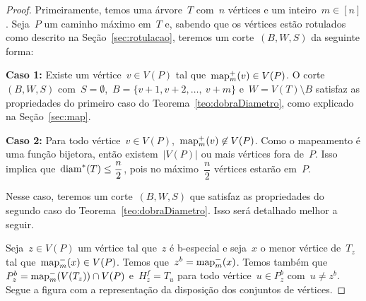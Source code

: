 		\begin{proof}
		Primeiramente, temos uma árvore~$T$ com~${n}$ vértices e um 
		inteiro~${m\in[n]}$.
		Seja~$P$ um caminho máximo em~$T$ e, sabendo que os vértices
		estão rotulados como descrito na Seção~\ref{sec:rotulacao},
		teremos um corte~$(B,W,S)$ da seguinte forma:
		\bigskip
		\bigskip

		\textbf{Caso 1:}
			Existe um vértice~${v\in V(P)}$ tal 
			que~${\mathrm{map}_m^+(v)\in V(P)}$. O 
			corte~$(B,W,S)$ 
			com~${S=\emptyset}$,~${B =\{v+1, v+2,\ldots,~v+m\}}$
			e~${W=V(T)\setminus B}$ satisfaz as propriedades do
			primeiro caso do Teorema~\ref{teo:dobraDiametro},
			como explicado na Seção~\ref{sec:map}.

	\bigskip
	\bigskip

		\textbf{Caso 2:}
			Para todo vértice~${v\in V(P)}$,~${\mathrm{map}_m^+(v)\not\in V(P)}$.
			Como o mapeamento é uma função bijetora, 
			então existem~$|V(P)|$ ou mais vértices fora de~$P$.
			Isso implica que~$\mathrm{diam}^*(T)\le\dfrac{n}{2}$, pois no 
			máximo~$\dfrac{n}{2}$ vértices estarão em~$P$.

			Nesse caso, teremos um corte~$(B,W,S)$ que satisfaz as
			propriedades do segundo caso do Teorema~\ref{teo:dobraDiametro}.
			Isso será detalhado melhor a seguir.

			\bigskip
			

			Seja~${z\in V(P)}$ um vértice tal que~$z$ é b-especial 
			e seja~$x$ o menor vértice de~$T_z$ tal 
			que~${\mathrm{map}^-_m(x)\in V(P)}$. Temos 
			que~${z^b = \mathrm{map}^-_m(x)}$.
			Temos também
			que~${P_z^b = \mathrm{map}^-_m(V(T_z))\cap V(P)}$
			e~${H_z^f =T_u}$ para todo 
			vértice~${u\in P_z^b}$ com~${u\ne z^b}$.
			Segue a figura com a representação da disposição dos 
			conjuntos de vértices.


\end{proof}
